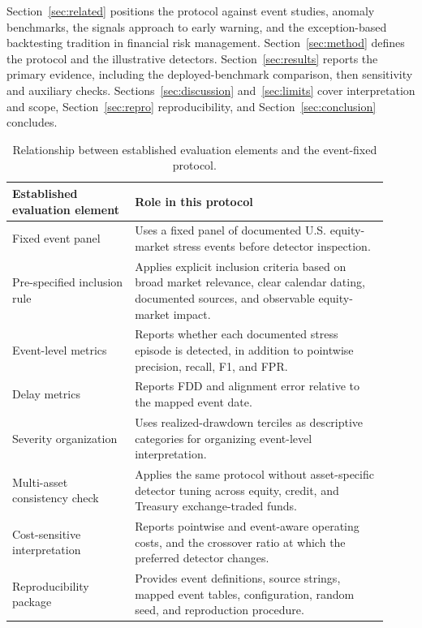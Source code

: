 \documentclass[pdflatex,sn-mathphys-num,iicol]{sn-jnl}
\begin{document}
Section~\ref{sec:related} positions the protocol against event studies, anomaly benchmarks, the signals approach to early warning, and the exception-based backtesting tradition in financial risk management. Section~\ref{sec:method} defines the protocol and the illustrative detectors. Section~\ref{sec:results} reports the primary evidence, including the deployed-benchmark comparison, then sensitivity and auxiliary checks. Sections~\ref{sec:discussion} and~\ref{sec:limits} cover interpretation and scope, Section~\ref{sec:repro} reproducibility, and Section~\ref{sec:conclusion} concludes.

\begin{table}[t]
\centering
\caption{Relationship between established evaluation elements and the event-fixed protocol.}
\label{tab:protocol_comparison}
\scriptsize
\begin{tabular}{p{0.30\linewidth}p{0.62\linewidth}}
\toprule
Established evaluation element & Role in this protocol\\
\midrule
Fixed event panel & Uses a fixed panel of documented U.S. equity-market stress events before detector inspection.\\
Pre-specified inclusion rule & Applies explicit inclusion criteria based on broad market relevance, clear calendar dating, documented sources, and observable equity-market impact.\\
Event-level metrics & Reports whether each documented stress episode is detected, in addition to pointwise precision, recall, F1, and FPR.\\
Delay metrics & Reports FDD and alignment error relative to the mapped event date.\\
Severity organization & Uses realized-drawdown terciles as descriptive categories for organizing event-level interpretation.\\
Multi-asset consistency check & Applies the same protocol without asset-specific detector tuning across equity, credit, and Treasury exchange-traded funds.\\
Cost-sensitive interpretation & Reports pointwise and event-aware operating costs, and the crossover ratio at which the preferred detector changes.\\
Reproducibility package & Provides event definitions, source strings, mapped event tables, configuration, random seed, and reproduction procedure.\\
\bottomrule
\end{tabular}
\end{table}
\end{document}
